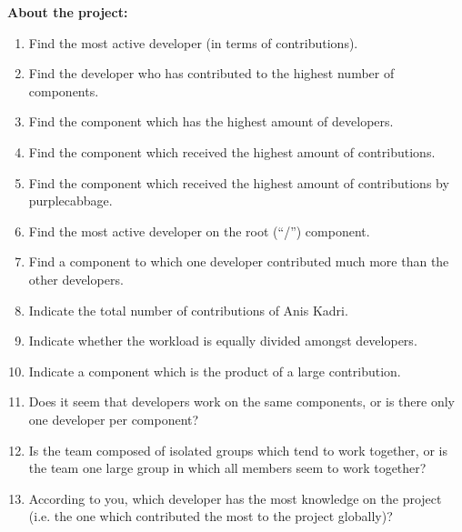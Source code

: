 \textbf{About the project:}
\begin{enumerate}
\item Find the most active developer (in terms of contributions).
\item Find the developer who has contributed to the highest number of components.
\item Find the component which has the highest amount of developers.
\item Find the component which received the highest amount of contributions.
\item Find the component which received the highest amount of contributions by purplecabbage.
\item Find the most active developer on the root (“/”) component.
\item Find a component to which one developer contributed much more than the other developers.
\item Indicate the total number of contributions of Anis Kadri.
\item Indicate whether the workload is equally divided amongst developers.
\item Indicate a component which is the product of a large contribution.
\item Does it seem that developers work on the same components, or is there only one developer per component?
\item Is the team composed of isolated groups which tend to work together, or is the team one large group in which all members seem to work together?
\item According to you, which developer has the most knowledge on the project (i.e. the one which contributed the most to the project globally)?
\end{enumerate}